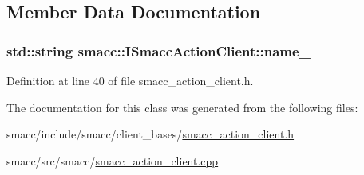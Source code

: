 \subsection{Member Data Documentation}
\subsubsection[{\texorpdfstring{name\+\_\+}{name_}}]{\setlength{\rightskip}{0pt plus 5cm}std\+::string smacc\+::\+I\+Smacc\+Action\+Client\+::name\+\_\+\hspace{0.3cm}{\ttfamily [protected]}}\hypertarget{classsmacc_1_1ISmaccActionClient_aec84a0169bf40d394207540ad75b364e}{}\label{classsmacc_1_1ISmaccActionClient_aec84a0169bf40d394207540ad75b364e}


Definition at line 40 of file smacc\+\_\+action\+\_\+client.\+h.



The documentation for this class was generated from the following files\+:\begin{DoxyCompactItemize}
\item 
smacc/include/smacc/client\+\_\+bases/\hyperlink{smacc__action__client_8h}{smacc\+\_\+action\+\_\+client.\+h}\item 
smacc/src/smacc/\hyperlink{src_2smacc_2smacc__action__client_8cpp}{smacc\+\_\+action\+\_\+client.\+cpp}\end{DoxyCompactItemize}
